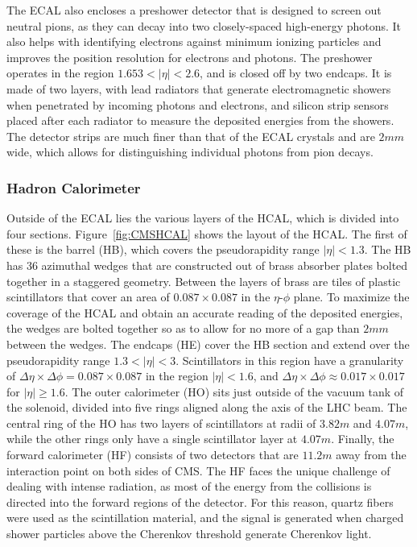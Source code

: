The ECAL also encloses a preshower detector that is designed to screen out neutral pions, as they can decay into two closely-spaced high-energy photons.
It also helps with identifying electrons against minimum ionizing particles and improves the position resolution for electrons and photons.
The preshower operates in the region $1.653<|\eta|<2.6$, and is closed off by two endcaps.
It is made of two layers, with lead radiators that generate electromagnetic showers when penetrated by incoming photons and electrons, and silicon strip sensors placed after each radiator to measure the deposited energies from the showers.
The detector strips are much finer than that of the ECAL crystals and are $2\unit{mm}$ wide, which allows for distinguishing individual photons from pion decays.

\subsubsection{Hadron Calorimeter}

Outside of the ECAL lies the various layers of the HCAL, which is divided into four sections.
Figure~\ref{fig:CMSHCAL} shows the layout of the HCAL.
The first of these is the barrel (HB), which covers the pseudorapidity range $|\eta|<1.3$.
The HB has 36 azimuthal wedges that are constructed out of brass absorber plates bolted together in a staggered geometry.
Between the layers of brass are tiles of plastic scintillators that cover an area of $0.087\times0.087$ in the $\eta$-$\phi$ plane.
To maximize the coverage of the HCAL and obtain an accurate reading of the deposited energies, the wedges are bolted together so as to allow for no more of a gap than $2\unit{mm}$ between the wedges.
The endcaps (HE) cover the HB section and extend over the pseudorapidity range $1.3<|\eta|<3$.
Scintillators in this region have a granularity of $\Delta\eta\times\Delta\phi=0.087\times0.087$ in the region $|\eta|<1.6$, and $\Delta\eta\times\Delta\phi\approx0.017\times0.017$ for $|\eta|\geq1.6$.
The outer calorimeter (HO) sits just outside of the vacuum tank of the solenoid, divided into five rings aligned along the axis of the LHC beam.
The central ring of the HO has two layers of scintillators at radii of $3.82\unit{m}$ and $4.07\unit{m}$, while the other rings only have a single scintillator layer at $4.07\unit{m}$.
Finally, the forward calorimeter (HF) consists of two detectors that are $11.2\unit{m}$ away from the interaction point on both sides of CMS.
The HF faces the unique challenge of dealing with intense radiation, as most of the energy from the collisions is directed into the forward regions of the detector.
For this reason, quartz fibers were used as the scintillation material, and the signal is generated when charged shower particles above the Cherenkov threshold generate Cherenkov light.


